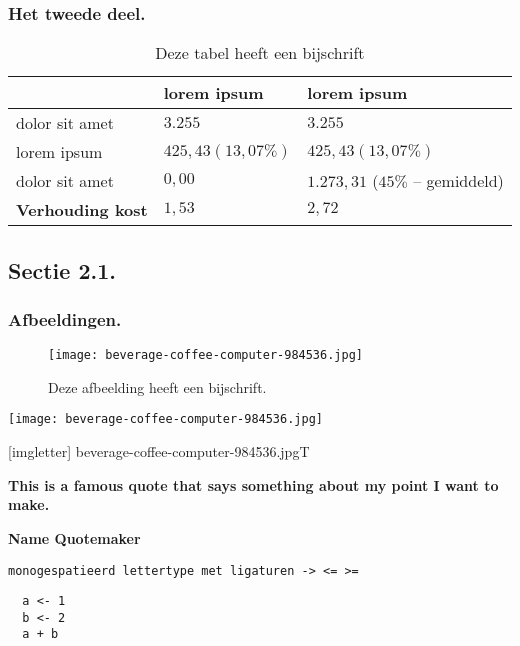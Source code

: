 \documentclass[aspectratio=169]{beamer}
\begin{document}
\begin{frame}
  \frametitle{Het tweede deel.}

  \begin{table}
    \begin{tabular}{lll}
      \toprule
                     & \textbf{lorem ipsum} & \textbf{lorem ipsum} \\
      \midrule
      dolor sit amet & $3.255$              & $3.255$ \\
      \midrule
      lorem ipsum    & $425,43 (13,07\%)$   & $425,43 (13,07\%)$ \\
      \midrule
      dolor sit amet & $0,00$               & $1.273,31$ ($45\%$ -- gemiddeld) \\
      \midrule
      \textbf{{\small Verhouding kost}} & \textbf{$1,53$} & \textbf{$2,72$}\\
      \bottomrule
    \end{tabular}

    \label{tab:voorbeeld}
    \caption{Deze tabel heeft een bijschrift}
  \end{table}
\end{frame}

\subsection{Sectie 2.1.}

\begin{frame}
  \frametitle{Afbeeldingen.}
  \begin{figure}
    \caption{Deze afbeelding heeft een bijschrift.}
    \texttt{[image: beverage-coffee-computer-984536.jpg]}
    \label{img:voorbeeld}
  \end{figure}
\end{frame}

\begin{frame}
  \texttt{[image: beverage-coffee-computer-984536.jpg]}
\end{frame}


{
[imgletter]%
  {beverage-coffee-computer-984536.jpg}{T}

\begin{frame}

  {\huge \textbf{This is a famous quote that says something about my point I want to make.}}

  \bigskip

  \textbf{Name Quotemaker}

\end{frame}
}

\begin{frame}[fragile]
  \texttt{monogespatieerd lettertype met ligaturen -> <= >=}

  \begin{verbatim}
  a <- 1
  b <- 2
  a + b
  \end{verbatim}
\end{frame}
\end{document}
